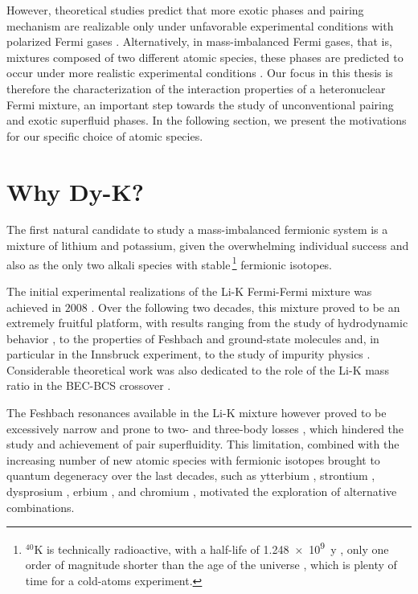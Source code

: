 However, theoretical studies predict that more exotic phases and pairing mechanism are realizable only under unfavorable experimental conditions with polarized Fermi gases \cite{Baarsma2010pam, Baarsma2013isp}. Alternatively, in mass-imbalanced Fermi gases, that is, mixtures composed of two different atomic species, these phases are predicted to occur under more realistic experimental conditions \cite{Wang2017eeo,Pini2021bmf}. Our focus in this thesis is therefore the characterization of the interaction properties of a heteronuclear Fermi mixture, an important step towards the study of unconventional pairing and exotic superfluid phases. In the following section, we present the motivations for our specific choice of atomic species.

\section{Why D\lowercase{y}-K?} 
\label{sec:WhyDyK}


The first natural candidate to study a mass-imbalanced fermionic system is a mixture of lithium and potassium, given the overwhelming individual success and also as the only two alkali species with stable\,\footnote{$^{40}$K is technically radioactive, with a half-life of \SI{1.248e9}{y} \cite{Kondev2021tne}, only one order of magnitude shorter than the age of the universe \cite{Planck2020p2r}, which is plenty of time for a cold-atoms experiment.} fermionic isotopes.


The initial experimental realizations of the Li-K Fermi-Fermi mixture was achieved in $2008$ \cite{Wille2008eau,Tiecke2009fri,Taglieber2008qdt}. Over the following two decades, this mixture proved to be an extremely fruitful platform, with results ranging from the study of hydrodynamic behavior \cite{Trenkwalder2011heo}, to the properties of Feshbach \cite{Voigt2009uhf,Jag2016lof} and ground-state molecules \cite{He2024eco} and, in particular in the Innsbruck experiment, to the study of impurity physics \cite{Kohstall2012mac, Cetina2016umb, Baroni2024mib}. Considerable theoretical work was also dedicated to the role of the Li-K mass ratio in the \ac{BEC}-\ac{BCS} crossover \cite{Yi2006, Mackie2005, Gandolfi2024bcs}.

The Feshbach resonances available in the Li-K mixture however proved to be excessively narrow and prone to two- and three-body losses \cite{Naik2011fri,Jag2016lof}, which hindered the study and achievement of pair superfluidity. This limitation, combined with the increasing number of new atomic species with fermionic isotopes brought to quantum degeneracy over the last decades, such as  ytterbium \cite{Fukuhara2007dfg}, strontium \cite{DeSalvo2010dfg}, dysprosium \cite{Lu2012qdd}, erbium \cite{Aikawa2014rfd}, and chromium \cite{Naylor2015cdf}, motivated the exploration of alternative combinations.

